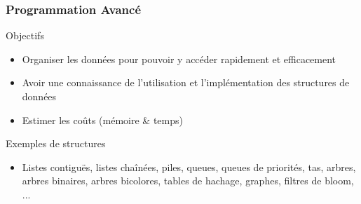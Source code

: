 \documentclass[12pt,svgnames]{beamer}
\begin{document}
\begin{frame}
	\frametitle{Programmation Avancé}
	\begin{block}{Objectifs}
		\begin{itemize}
		\item Organiser les données pour pouvoir y accéder rapidement et efficacement
		\item Avoir une connaissance de l'utilisation et l'implémentation des structures de données
		\item Estimer les coûts (mémoire \& temps)
		\end{itemize}
	\end{block}{}
	\begin{block}{Exemples de structures}
		\begin{itemize}
		\item Listes contiguës, listes chaînées, piles, queues, queues de priorités, tas, arbres, arbres binaires, arbres bicolores, tables de hachage, graphes, filtres de bloom, ...
		\end{itemize}
	\end{block}
\end{frame}
\end{document}
